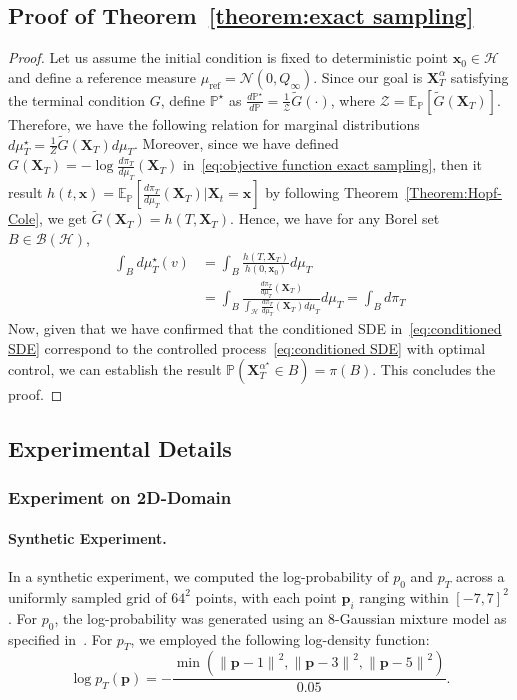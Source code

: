 \documentclass[nohyperref]{article}
\theoremstyle{plain}
\theoremstyle{remark}
\newcommand{\mc}{\mathcal}
\newcommand{\mb}{\mathbf}
\newcommand{\norm}[1]{\left\lVert#1\right\rVert}
\begin{document}
\subsection{Proof of Theorem~\ref{theorem:exact sampling}}
\begin{proof} Let us assume the initial condition is fixed to deterministic point $\mb{x}_0 \in \mc{H}$ and define a reference measure $\mu_{\text{ref}} = \mc{N}(0, Q_{\infty})$. Since our goal is $\mb{X}^{\alpha}_T$ satisfying the terminal condition $G$, define $\mathbb{P}^{\star}$ as $\frac{d\mathbb{P}^{\star}}{d\mathbb{P}}  = \frac{1}{\mc{Z}}\tilde{G}(\cdot) $, where $\mc{Z} = \mathbb{E}_{\mathbb{P}}[\tilde{G}(\mb{X}_T)]$. Therefore, we have the following relation for marginal distributions $d\mu_T^{\star} = \frac{1}{Z}\tilde{G}(\mb{X}_T) d\mu_T$.
Moreover, since we have defined $G(\mb{X}_T) = -\log \frac{d\pi_T}{d\mu_T}(\mb{X}_T)$ in~\eqref{eq:objective function exact sampling}, then it result $h(t, \mb{x}) = \mathbb{E}_{\mathbb{P}}\left[\frac{d\pi_T}{d\mu_T}(\mb{X}_T) | \mb{X}_t=\mb{x}\right]$ by following Theorem~\ref{Theorem:Hopf-Cole}, we get $\tilde{G}(\mb{X}_T) = h(T, \mb{X}_T)$. Hence, we have for any Borel set $B \in \mc{B}(\mc{H})$,
\begin{align}
    \int_B d\mu^{\star}_T(v) &= \int_B \frac{h(T, \mb{X}_T)}{h(0, \mb{x}_0)} d\mu_T \\
    & = \int_B \frac{\frac{d\pi_T}{d\mu_T}(\mb{X}_T)}{\int_{\mc{H}} \frac{d\pi_T}{d\mu_T}(\mb{X}_T) d\mu_T} d\mu_T = \int_B d\pi_T
\end{align}
Now, given that we have confirmed that the conditioned SDE in~\eqref{eq:conditioned SDE} correspond to the controlled process~\eqref{eq:conditioned SDE} with optimal control, we can establish the result $\mathbb{P}(\mb{X}^{\alpha^{\star}}_T \in B) = \pi(B)$. This concludes the proof.
\end{proof}

\subsection{Experimental Details}\label{sec:experimental details}
\subsubsection{Experiment on 2D-Domain}
\paragraph{Synthetic Experiment. } In a synthetic experiment, we computed the log-probability of $p_0$ and $p_T$ across a uniformly sampled grid of $64^2$ points, with each point $\mb{p}_i$ ranging within $[-7, 7]^2$. For $p_0$, the log-probability was generated using an 8-Gaussian mixture model as specified in~\citep{tong2024improving}. For $p_T$, we employed the following log-density function:
\begin{equation}
\log p_T(\mb{p}) = -\frac{\min(\norm{\mb{p} - 1}^2, \norm{\mb{p} - 3}^2, \norm{\mb{p} - 5}^2)}{0.05}.
\end{equation}
\end{document}
